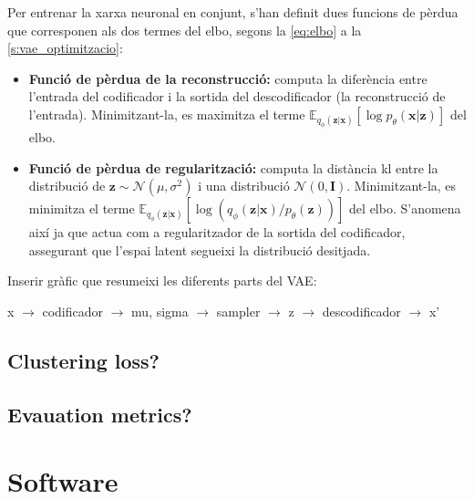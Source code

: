 \documentclass[CAT,BIB]{TFUOC}%
\newcommand{\todo}[1]{
            \begin{tcolorbox}[title=ToDo!, colback=red!5!white, colframe=red!50!black, coltext=red!50!black]
            #1
            \end{tcolorbox}}
\begin{document}
            Per entrenar la xarxa neuronal en conjunt,
            s'han definit dues funcions de pèrdua
            que corresponen als dos termes del \gls{elbo},
            segons la \cref{eq:elbo} a la \cref{s:vae_optimitzacio}:

            \begin{itemize}
                \item \textbf{Funció de pèrdua de la reconstrucció:}
                computa la diferència entre l'entrada del codificador
                i la sortida del descodificador
                (la reconstrucció de l'entrada).
                Minimitzant-la, es maximitza el terme
                $\mathbb{E}_{q_\phi(\mathbf{z|x})} [ \log p_\theta(\mathbf{x|z}) ]$
                del \gls{elbo}.

                \item \textbf{Funció de pèrdua de regularització:}
                computa la distància \gls{kl}
                entre la distribució de $\mathbf{z} \sim \mathcal{N}(\mu, \sigma^2)$
                i una distribució $\mathcal{N}(0, \mathbf{I})$.
                Minimitzant-la, es minimitza el terme
                $\mathbb{E}_{q_\phi(\mathbf{z|x})} [ \log ( q_\phi(\mathbf{z|x}) / p_\theta(\mathbf{z}) ) ]$
                del \gls{elbo}.
                S'anomena així ja que actua com a regularitzador
                de la sortida del codificador,
                assegurant que l'espai latent segueixi la distribució desitjada.
            \end{itemize}

\todo{
    Inserir gràfic que resumeixi les diferents parts del VAE:

    x $\rightarrow$ codificador $\rightarrow$ mu, sigma $\rightarrow$ sampler $\rightarrow$ z $\rightarrow$ descodificador $\rightarrow$ x'
}



    \subsection{Clustering loss?}
    \label{s:??}


    \subsection{Evauation metrics?}
    \label{s:???}

    \section{Software}
    \label{s:software}
\end{document}
